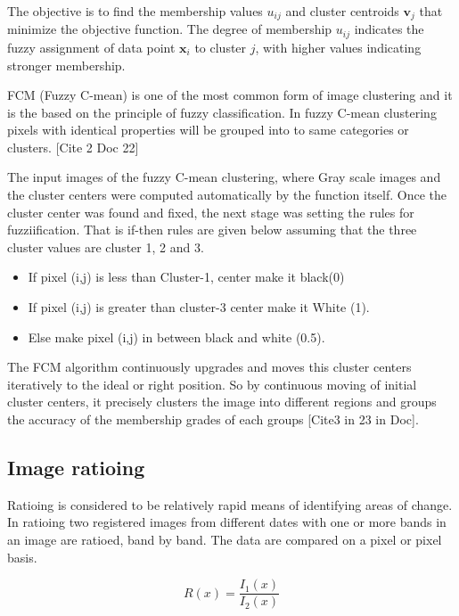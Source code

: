 \documentclass[12pt,a4paper,IEEEtran]{article}
\begin{document}
The objective is to find the membership values \( u_{ij} \) and cluster centroids \( \mathbf{v}_j \) that minimize the objective function. The degree of membership \( u_{ij} \) indicates the fuzzy assignment of data point \( \mathbf{x}_i \) to cluster \( j \), with higher values indicating stronger membership.


FCM (Fuzzy C-mean) is one of the most common form of image clustering and it is the based on the principle of fuzzy classification. In fuzzy C-mean clustering pixels with identical properties will be grouped into to same categories or clusters. [Cite 2 Doc 22]

The input images of the fuzzy C-mean clustering, where Gray scale images and the cluster centers were computed automatically by the function itself. Once the cluster center was found and fixed, the next stage was setting the rules for fuzziification. That is if-then rules are given below assuming that the three cluster values are cluster 1, 2 and 3.
\begin{itemize}
	
	\item If pixel (i,j) is less than Cluster-1, center make it black(0)
	\item If pixel (i,j) is greater than cluster-3 center make it White (1).
	\item Else make pixel (i,j) in between black and white (0.5). 	
\end{itemize}

The FCM algorithm continuously upgrades and moves this cluster centers iteratively to the ideal or right position. So by continuous moving of initial cluster centers, it precisely clusters the image into different regions and groups the accuracy of the membership grades of each groups [Cite3 in 23 in Doc]. 


\subsection[3.3]{Image ratioing}
Ratioing is considered to be relatively rapid means of identifying areas of change. In ratioing two registered images from different dates with one or more bands in an image are ratioed, band by band. The data are compared on a pixel or pixel basis. 

\begin{equation}
R(x) = \frac{I_{1}(x)}{I_{2}(x)}
\end{equation}
\end{document}
